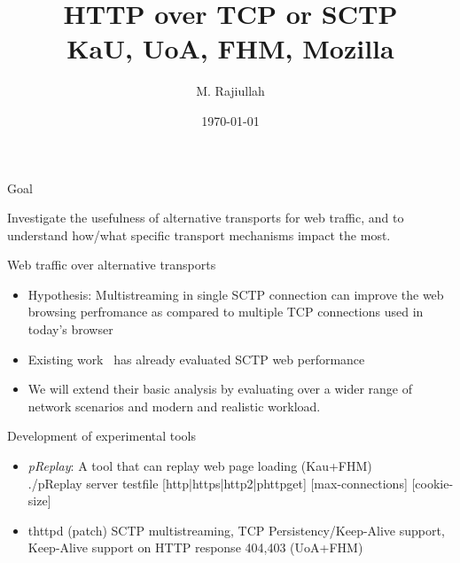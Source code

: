 \documentclass[t,xcolor=dvipsnames,english,bigger,aspectratio=43,hyperref={unicode=true}]{beamer}
\author{M. Rajiullah}
\date{\today}
\title{\LARGE{HTTP over TCP or SCTP}\\ KaU, UoA, FHM, Mozilla}
\begin{document}
\maketitle

\begin{frame}{Goal}
 \vfill
\begin{center}
\begin{tcolorbox}[colback=green!5,colframe=green!40!black]
Investigate the usefulness of alternative transports for web traffic, and to understand 
how/what specific transport mechanisms impact the most.
\end{tcolorbox}
\end{center}
 \vfill
\end{frame}
\begin{frame}{Web traffic over alternative transports}
\begin{itemize}
\item Hypothesis: Multistreaming in single SCTP connection can improve the web browsing perfromance 
as compared to multiple TCP connections used in today's browser
\item Existing work~\cite{Natarajan06,Natarajan08,Natarajan09,Xue09} has already evaluated SCTP web performance
\item We will extend their basic analysis by evaluating over a wider range of network scenarios and modern 
and realistic workload.
\end{itemize}
\end{frame}
\begin{frame}{Development of experimental tools}
\begin{itemize}
\item \textit{pReplay}: A tool that can replay web page loading (Kau+FHM) \\
\color{red} ./pReplay server testfile [http|https|http2|phttpget] [max-connections] [cookie-size] \color{black}
\item thttpd (patch)  SCTP multistreaming, TCP Persistency/Keep-Alive support, 
Keep-Alive support on HTTP response 404,403 (UoA+FHM) 
\end{itemize}
\end{frame}
\end{document}
